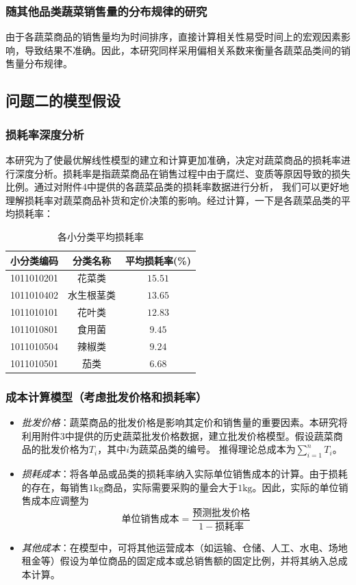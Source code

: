 \documentclass{article}
\begin{document}
\subsubsection{随其他品类蔬菜销售量的分布规律的研究}
由于各蔬菜商品的销售量均为时间排序，直接计算相关性易受时间上的宏观因素影响，导致结果不准确。因此，本研究同样采用偏相关系数来衡量各蔬菜品类间的销售量分布规律。

\subsection{问题二的模型假设}

\subsubsection{损耗率深度分析}
本研究为了使最优解线性模型的建立和计算更加准确，决定对蔬菜商品的损耗率进行深度分析。损耗率是指蔬菜商品在销售过程中由于腐烂、变质等原因导致的损失比例。通过对附件4中提供的各蔬菜品类的损耗率数据进行分析，
我们可以更好地理解损耗率对蔬菜商品补货和定价决策的影响。经过计算，一下是各蔬菜品类的平均损耗率：
\begin{table}[H]
\centering
\caption{各小分类平均损耗率}
\begin{tabular}{|c|c|c|}
\hline
小分类编码 & 分类名称 & 平均损耗率(\%) \\
\hline
1011010201 & 花菜类 & $15.51$ \\
1011010402 & 水生根茎类 & $13.65$ \\
1011010101 & 花叶类 & $12.83$ \\
1011010801 & 食用菌 & $9.45$ \\
1011010504 & 辣椒类 & $9.24$ \\
1011010501 & 茄类 & $6.68$ \\
\hline
\end{tabular}
\end{table}

\subsubsection{成本计算模型（考虑批发价格和损耗率）}
\begin{itemize}
    \item \textit{批发价格}：蔬菜商品的批发价格是影响其定价和销售量的重要因素。本研究将利用附件3中提供的历史蔬菜批发价格数据，建立批发价格模型。假设蔬菜商品的批发价格为$T_i$，其中$i$为蔬菜品类的编号。
    推得理论总成本为$\sum_{i=1}^{n} T_i$。
    \item \textit{损耗成本}：将各单品或品类的损耗率纳入实际单位销售成本的计算。由于损耗的存在，每销售$1 \text{kg}$商品，实际需要采购的量会大于$1 \text{kg}$。因此，实际的单位销售成本应调整为
    \[
    \text{单位销售成本} = \frac{\text{预测批发价格}}{1 - \text{损耗率}}
    \]
    \item \textit{其他成本}：在模型中，可将其他运营成本（如运输、仓储、人工、水电、场地租金等）假设为单位商品的固定成本或总销售额的固定比例，并将其纳入总成本计算。
\end{itemize}
\end{document}
